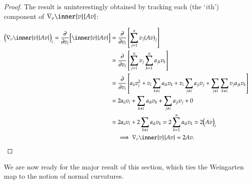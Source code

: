     \begin{proof}
        The result is uninterestingly obtained by tracking
        each (the `$i$th') component of
        $\nabla_{v} \inner{v}{Av}$:
        
        \begin{align}
        {\Big(\nabla_{v} \inner{v}{Av}\Big)}_{i} =
                \frac{\partial}{\partial v_i} \Big[
                \inner{v}{Av}\Big]
                &=  \frac{\partial}{\partial v_i} \left[
                    \sum_{j=1}^{n} v_j {(Av)}_j\right] \\
                &=	\frac{\partial}{\partial v_i} \left[
                \sum_{j=1}^{n} v_j \sum_{k=1}^n a_{jk} v_k \right] \\
                &= \frac{\partial}{\partial v_i} \left[
                a_{ii} v_i^2 + v_i \sum_{k\ne i} a_{ik} v_k
                 + v_i \sum_{j\ne i} a_{ji} v_j
                 + \sum_{j\ne i} \sum_{k \ne i} v_j a_{jk} v_k \right] \\
    &=  2 a_{ii} v_i + \sum_{k\ne i} a_{ik} v_k
    + \sum_{j\ne i} a_{ji} v_j + 0 \\
    &= 2 a_{ii} v_i + 2 \sum_{k\ne i} a_{ik} v_k
     = 2 \sum_{k=1}^n a_{ik}v_{k} = 2 {\big(Av\big)}_i \\
     &\quad \implies \nabla_{v} \inner{v}{Av} = 2Av.
        \end{align}
    \end{proof}
    
    We are now ready for the major result of this section, which ties the Weingarten map to the
    notion of normal curvatures.
    
